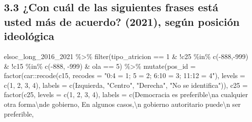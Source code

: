 \documentclass[
  12pt,
]{book}
\newenvironment{Shaded}{\begin{snugshade}}{\end{snugshade}}
\newcommand{\AttributeTok}[1]{\textcolor[rgb]{0.77,0.63,0.00}{#1}}
\newcommand{\DecValTok}[1]{\textcolor[rgb]{0.00,0.00,0.81}{#1}}
\newcommand{\FunctionTok}[1]{\textcolor[rgb]{0.00,0.00,0.00}{#1}}
\newcommand{\NormalTok}[1]{#1}
\newcommand{\SpecialCharTok}[1]{\textcolor[rgb]{0.00,0.00,0.00}{#1}}
\newcommand{\StringTok}[1]{\textcolor[rgb]{0.31,0.60,0.02}{#1}}
\begin{document}
\hypertarget{con-cuuxe1l-de-las-siguientes-frases-estuxe1-usted-muxe1s-de-acuerdo-2021-seguxfan-posiciuxf3n-ideoluxf3gica}{%
\subsection{3.3 ¿Con cuál de las siguientes frases está usted más de acuerdo? (2021), según posición ideológica}\label{con-cuuxe1l-de-las-siguientes-frases-estuxe1-usted-muxe1s-de-acuerdo-2021-seguxfan-posiciuxf3n-ideoluxf3gica}}

\begin{Shaded}
\begin{Highlighting}[]
\NormalTok{elsoc\_long\_2016\_2021 }\SpecialCharTok{\%\textgreater{}\%}
  \FunctionTok{filter}\NormalTok{(tipo\_atricion }\SpecialCharTok{==} \DecValTok{1} \SpecialCharTok{\&} \SpecialCharTok{!}\NormalTok{c25 }\SpecialCharTok{\%in\%} \FunctionTok{c}\NormalTok{(}\SpecialCharTok{{-}}\DecValTok{888}\NormalTok{,}\SpecialCharTok{{-}}\DecValTok{999}\NormalTok{) }\SpecialCharTok{\&} 
           \SpecialCharTok{!}\NormalTok{c15 }\SpecialCharTok{\%in\%} \FunctionTok{c}\NormalTok{(}\SpecialCharTok{{-}}\DecValTok{888}\NormalTok{, }\SpecialCharTok{{-}}\DecValTok{999}\NormalTok{) }\SpecialCharTok{\&}\NormalTok{ ola }\SpecialCharTok{==} \DecValTok{5}\NormalTok{) }\SpecialCharTok{\%\textgreater{}\%}
  \FunctionTok{mutate}\NormalTok{(}\AttributeTok{pos\_id =} \FunctionTok{factor}\NormalTok{(car}\SpecialCharTok{::}\FunctionTok{recode}\NormalTok{(c15, }\AttributeTok{recodes =} \StringTok{"0:4 = 1; 5 = 2; 6:10 = 3; 11:12 = 4"}\NormalTok{),}
                     \AttributeTok{levels =} \FunctionTok{c}\NormalTok{(}\DecValTok{1}\NormalTok{, }\DecValTok{2}\NormalTok{, }\DecValTok{3}\NormalTok{, }\DecValTok{4}\NormalTok{),}
                     \AttributeTok{labels =} \FunctionTok{c}\NormalTok{(}\StringTok{\textquotesingle{}Izquierda\textquotesingle{}}\NormalTok{, }\StringTok{"Centro"}\NormalTok{, }\StringTok{"Derecha"}\NormalTok{, }\StringTok{"No se identifica"}\NormalTok{)),}
         \AttributeTok{c25 =} \FunctionTok{factor}\NormalTok{(c25, }
                      \AttributeTok{levels =} \FunctionTok{c}\NormalTok{(}\DecValTok{1}\NormalTok{, }\DecValTok{2}\NormalTok{, }\DecValTok{3}\NormalTok{, }\DecValTok{4}\NormalTok{),}
                      \AttributeTok{labels =} \FunctionTok{c}\NormalTok{(}\StringTok{\textquotesingle{}Democracia es preferible}\SpecialCharTok{\textbackslash{}n}\StringTok{a cualquier otra forma}\SpecialCharTok{\textbackslash{}n}\StringTok{de gobierno\textquotesingle{}}\NormalTok{, }
                                 \StringTok{\textquotesingle{}En algunos casos,}\SpecialCharTok{\textbackslash{}n}\StringTok{ gobierno autoritario puede}\SpecialCharTok{\textbackslash{}n}\StringTok{ ser preferible\textquotesingle{}}\NormalTok{,}

\end{Highlighting}
\end{Shaded}
\end{document}
